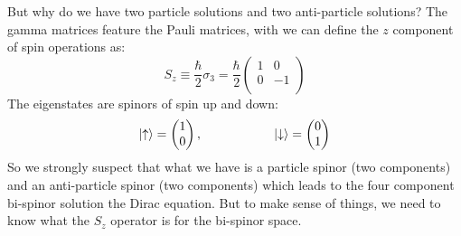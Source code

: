 \documentclass[12pt]{book}
\begin{document}
But why do we have two particle solutions and two anti-particle solutions?  The gamma matrices feature the Pauli matrices, with we can define the $z$ component of spin operations as:
$$S_z \equiv \frac{\hbar}{2} \sigma_3 = \frac{\hbar}{2} \begin{pmatrix}
1 & 0 \\
0 & -1 \\
\end{pmatrix}
$$
The eigenstates are spinors of spin up and down:
$$\ket{\uparrow} = \begin{pmatrix} 1 \\ 0 \\ \end{pmatrix},
\hspace{2cm}
\ket{\downarrow} = \begin{pmatrix} 0 \\ 1 \\ \end{pmatrix}
$$
So we strongly suspect that what we have is a particle spinor (two components) and an anti-particle spinor (two components) which leads to the four component bi-spinor solution the Dirac equation.  But to make sense of things, we need to know what the $S_z$ operator is for the bi-spinor space.
\end{document}
